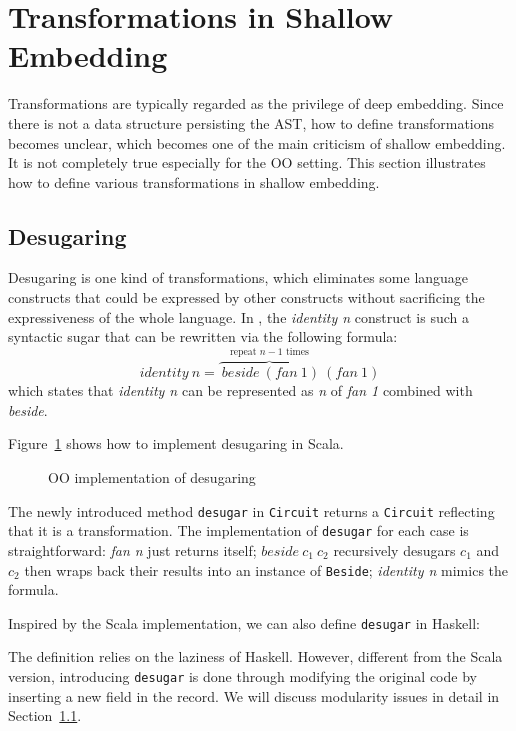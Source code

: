 \section{Transformations in Shallow Embedding}
Transformations are typically regarded as the privilege of deep embedding.
Since there is not a data structure persisting the AST, how to define transformations
becomes unclear, which becomes one of the main criticism of shallow embedding.
It is not completely true especially for the OO setting.
This section illustrates how to define various transformations in shallow embedding.

\subsection{Desugaring}
Desugaring is one kind of transformations, which eliminates some
language constructs that could be expressed by other constructs without
sacrificing the expressiveness of the whole language.
In \dsl, the \emph{identity n} construct is such a syntactic sugar that can
be rewritten via the following formula:
$$identity\ n = \overbrace{\ beside\ (fan\ 1)}^{\text{repeat }n-1\text{ times}}\ (fan\ 1)$$
which states that \emph{identity n} can be represented as \emph{n} of \emph{fan 1} combined with \emph{beside}.

Figure~\ref{code:desugar} shows how to implement desugaring in Scala.
\begin{figure}
\caption{OO implementation of desugaring}
\label{code:desugar}
\end{figure}
The newly introduced method \texttt{desugar} in \texttt{Circuit} returns a \texttt{Circuit} reflecting that it is a transformation. The implementation of \texttt{desugar} for each case is
straightforward: \emph{fan n} just returns itself; $beside\ c_1\ c_2$ recursively desugars $c_1$ and $c_2$ then wraps back
their results into an instance of \texttt{Beside}; \emph{identity n} mimics the
formula.

Inspired by the Scala implementation, we can also define \texttt{desugar} in Haskell:

The definition relies on the laziness of Haskell.
However, different from the Scala version, introducing \texttt{desugar} is done
through modifying the original code by inserting a new field in the record.
We will discuss modularity issues in detail in Section~\ref{}.


